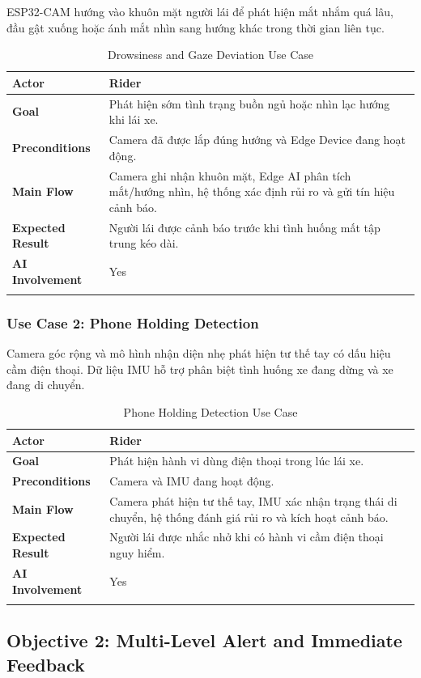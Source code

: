 \documentclass[12pt,a4paper]{article}
\begin{document}
ESP32-CAM hướng vào khuôn mặt người lái để phát hiện mắt nhắm quá lâu, đầu gật xuống hoặc ánh mắt nhìn sang hướng khác trong thời gian liên tục.

\begin{longtable}{|P{3.5cm}|P{11cm}|}
\hline
\textbf{Actor} & Rider \\
\hline
\textbf{Goal} & Phát hiện sớm tình trạng buồn ngủ hoặc nhìn lạc hướng khi lái xe. \\
\hline
\textbf{Preconditions} & Camera đã được lắp đúng hướng và Edge Device đang hoạt động. \\
\hline
\textbf{Main Flow} & Camera ghi nhận khuôn mặt, Edge AI phân tích mắt/hướng nhìn, hệ thống xác định rủi ro và gửi tín hiệu cảnh báo. \\
\hline
\textbf{Expected Result} & Người lái được cảnh báo trước khi tình huống mất tập trung kéo dài. \\
\hline
\textbf{AI Involvement} & Yes \\
\hline
\caption{Drowsiness and Gaze Deviation Use Case}
\end{longtable}

\subsubsection{Use Case 2: Phone Holding Detection}

Camera góc rộng và mô hình nhận diện nhẹ phát hiện tư thế tay có dấu hiệu cầm điện thoại. Dữ liệu IMU hỗ trợ phân biệt tình huống xe đang dừng và xe đang di chuyển.

\begin{longtable}{|P{3.5cm}|P{11cm}|}
\hline
\textbf{Actor} & Rider \\
\hline
\textbf{Goal} & Phát hiện hành vi dùng điện thoại trong lúc lái xe. \\
\hline
\textbf{Preconditions} & Camera và IMU đang hoạt động. \\
\hline
\textbf{Main Flow} & Camera phát hiện tư thế tay, IMU xác nhận trạng thái di chuyển, hệ thống đánh giá rủi ro và kích hoạt cảnh báo. \\
\hline
\textbf{Expected Result} & Người lái được nhắc nhở khi có hành vi cầm điện thoại nguy hiểm. \\
\hline
\textbf{AI Involvement} & Yes \\
\hline
\caption{Phone Holding Detection Use Case}
\end{longtable}

\subsection{Objective 2: Multi-Level Alert and Immediate Feedback}
\end{document}
